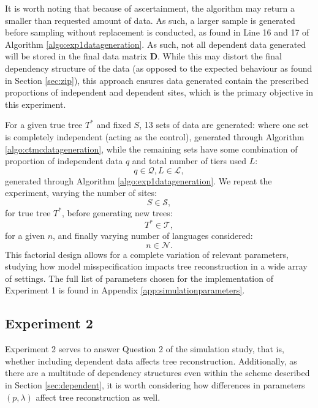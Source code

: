 It is worth noting that because of ascertainment, the algorithm may return a smaller than requested amount of data. As such, a larger sample is generated before sampling without replacement is conducted, as found in Line 16 and 17 of Algorithm \ref{algo:exp1datageneration}. As such, not all dependent data generated will be stored in the final data matrix $\mathbf{D}$. While this may distort the final dependency structure of the data (as opposed to the expected behaviour as found in Section \ref{sec:zip}), this approach ensures data generated contain the prescribed proportions of independent and dependent sites, which is the primary objective in this experiment.

For a given true tree $T^*$ and fixed $S$, 13 sets of data are generated: where one set is completely independent (acting as the control), generated through Algorithm \ref{algo:ctmcdatageneration}, while the remaining sets have some combination of proportion of independent data $q$ and total number of tiers used $L$:
\begin{equation}
    q \in \mathcal{Q}, L \in \mathcal{L},
\end{equation}
generated through Algorithm \ref{algo:exp1datageneration}. We repeat the experiment, varying the number of sites: 
\begin{equation}
\label{eq:3.2}
    S\in \mathcal{S},
\end{equation} 
for true tree $T^*$, before generating new trees:
\begin{equation}
\label{eq:3.3}
    T^* \in \mathcal{T},
\end{equation} for a given $n$, and finally varying number of languages considered:
\begin{equation}
\label{eq:3.4}
    n \in \mathcal{N}.
\end{equation}
This factorial design allows for a complete variation of relevant parameters, studying how model misspecification impacts tree reconstruction in a wide array of settings. The full list of parameters chosen for the implementation of Experiment 1 is found in Appendix \ref{app:simulationparameters}.

\subsection{Experiment 2}
Experiment 2 serves to answer Question 2 of the simulation study, that is, whether including dependent data affects tree reconstruction. Additionally, as there are a multitude of dependency structures even within the scheme described in Section \ref{sec:dependent}, it is worth considering how differences in parameters $(p, \lambda)$ affect tree reconstruction as well. 


